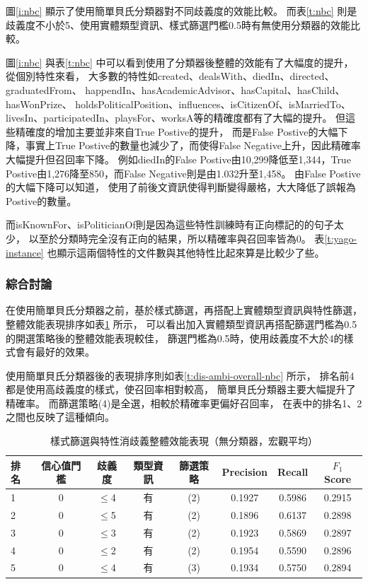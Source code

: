 

圖\ref{i:nbc} 顯示了使用簡單貝氏分類器對不同歧義度的效能比較。
而表\ref{t:nbc} 則是歧義度不小於5、使用實體類型資訊、樣式篩選門檻0.5時有無使用分類器的效能比較。

圖\ref{i:nbc} 與表\ref{t:nbc} 中可以看到使用了分類器後整體的效能有了大幅度的提升，
從個別特性來看，
大多數的特性如created、dealsWith、diedIn、directed、graduatedFrom、
happendIn、hasAcademicAdvisor、hasCapital、hasChild、hasWonPrize、
holdsPoliticalPosition、influences、isCitizenOf、isMarriedTo、
livesIn、participatedIn、playsFor、worksA等的精確度都有了大幅的提升。
但這些精確度的增加主要並非來自True Postive的提升，
而是False Postive的大幅下降，事實上True Postive的數量也減少了，而使得False Negative上升，因此精確率大幅提升但召回率下降。
例如diedIn的False Postive由10,299降低至1,344，True Postive由1,276降至850，而False Negative則是由1.032升至1,458。
由False Postive的大幅下降可以知道，
使用了前後文資訊使得判斷變得嚴格，大大降低了誤報為Postive的數量。

而isKnownFor、isPoliticianOf則是因為這些特性訓練時有正向標記的的句子太少，
以至於分類時完全沒有正向的結果，所以精確率與召回率皆為0。
表\ref{t:yago-instance} 也顯示這兩個特性的文件數與其他特性比起來算是比較少了些。

\subsubsection{綜合討論}
在使用簡單貝氏分類器之前，基於樣式篩選，再搭配上實體類型資訊與特性篩選，
整體效能表現排序如表\ref{t:dis-ambi-overall-no-nbc} 所示，
可以看出加入實體類型資訊再搭配篩選門檻為0.5的開選策略後的整體效能表現較佳，
篩選門檻為0.5時，使用歧義度不大於4的樣式會有最好的效果。

使用簡單貝氏分類器後的表現排序則如表\ref{t:dis-ambi-overall-nbc} 所示，
排名前4都是使用高歧義度的樣式，使召回率相對較高，
簡單貝氏分類器主要大幅提升了精確率。
而篩選策略(4)是全選，相較於精確率更偏好召回率，
在表中的排名1、2之間也反映了這種傾向。

\begin{table}
    \caption{樣式篩選與特性消歧義整體效能表現（無分類器，宏觀平均）}
    \label{t:dis-ambi-overall-no-nbc}
    \footnotesize
    \begin{center}
        \begin{tabular}{|l||c|c||c|c||c|c|c|}
            \hline
            排名 & 信心值門檻 & 歧義度 & 類型資訊 & 篩選策略 & Precision & Recall & $F_1$ Score \\
            \hline
            1 & 0 & $\leq$4 & 有 & (2) & 0.1927 & 0.5986 & 0.2915 \\
            2 & 0 & $\leq$5 & 有 & (2) & 0.1896 & 0.6137 & 0.2898 \\
            3 & 0 & $\leq$3 & 有 & (2) & 0.1923 & 0.5869 & 0.2897 \\
            4 & 0 & $\leq$2 & 有 & (2) & 0.1954 & 0.5590 & 0.2896 \\
            5 & 0 & $\leq$4 & 有 & (3) & 0.1934 & 0.5750 & 0.2894 \\
            \hline
        \end{tabular}
    \end{center}
\end{table}

